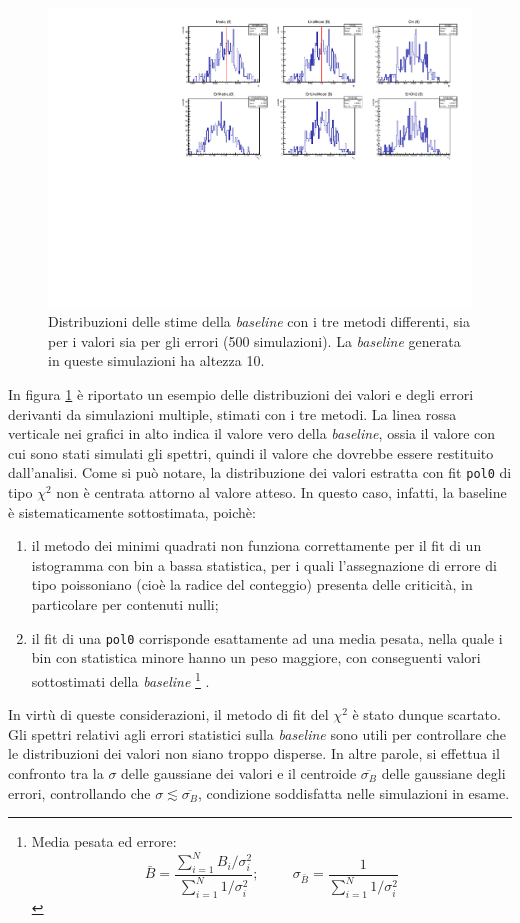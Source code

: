 \begin{figure}[H]
 \includegraphics[scale=0.75]{img/baseline_sim_500.pdf}
 \caption{Distribuzioni delle stime della \textit{baseline} con i tre metodi differenti, sia per i valori sia per gli errori (500 simulazioni). La \textit{baseline} generata in queste simulazioni ha altezza 10.}
 \label{fig::baseline_500}
\end{figure}
In figura \ref{fig::baseline_500} è riportato un esempio delle distribuzioni dei valori e degli errori derivanti da simulazioni multiple, stimati con i tre metodi. La linea rossa verticale nei grafici in alto indica il valore vero della \textit{baseline}, ossia il valore con cui sono stati simulati gli spettri, quindi il valore che dovrebbe essere restituito dall'analisi. Come si può notare, la distribuzione dei valori estratta con fit \lstinline{pol0} di tipo $\chi^2$ non è centrata attorno al valore atteso. In questo caso, infatti, la baseline è sistematicamente sottostimata, poichè:
\begin{enumerate}
 \item il metodo dei minimi quadrati non funziona correttamente per il fit di un istogramma con bin a bassa statistica, per i quali l'assegnazione di errore di tipo poissoniano (cioè la radice del conteggio) presenta delle criticità, in particolare per contenuti nulli;
 \item il fit di una \lstinline{pol0} corrisponde esattamente ad una media pesata, nella quale i bin con statistica minore hanno un peso maggiore, con conseguenti valori sottostimati della \textit{baseline}
 \footnote{Media pesata ed errore:
 $$\bar{B}=\frac{\sum_{i=1}^N B_i/\sigma_i^2}{\sum_{i=1}^N 1/\sigma_i^2};
 \hspace{1cm} \sigma_{\bar{B}}=\frac{1}{\sum_{i=1}^N1/\sigma_i^2}
 $$}
 .
\end{enumerate}
In virtù di queste considerazioni, il metodo di fit del $\chi^2$ è stato dunque scartato. 
Gli spettri relativi agli errori statistici sulla \textit{baseline} sono utili per controllare che le distribuzioni dei valori non siano troppo disperse. In altre parole, si effettua il confronto tra la $\sigma$ delle gaussiane dei valori e il centroide $\overline{\sigma_{B}}$ delle gaussiane degli errori, controllando che $\sigma\lesssim \overline{\sigma_{B}}$, condizione soddisfatta nelle simulazioni in esame.



 